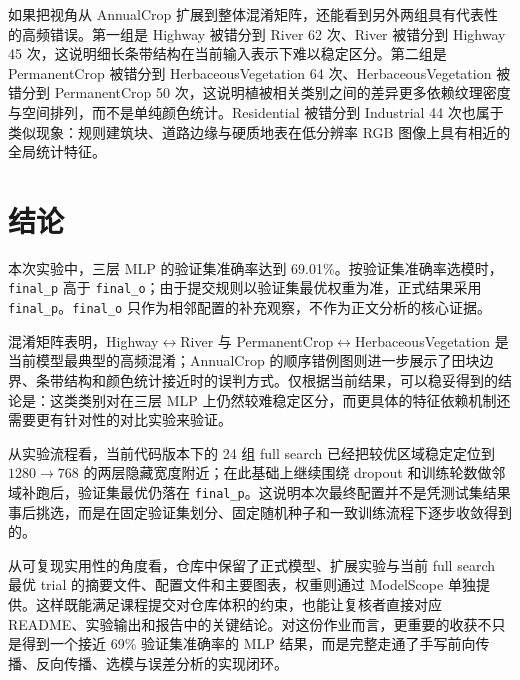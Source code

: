 \documentclass[lang=cn,a4paper,newtx,code=minted]{elegantpaper}
\begin{document}
如果把视角从 AnnualCrop 扩展到整体混淆矩阵，还能看到另外两组具有代表性的高频错误。第一组是 Highway 被错分到 River 62 次、River 被错分到 Highway 45 次，这说明细长条带结构在当前输入表示下难以稳定区分。第二组是 PermanentCrop 被错分到 HerbaceousVegetation 64 次、HerbaceousVegetation 被错分到 PermanentCrop 50 次，这说明植被相关类别之间的差异更多依赖纹理密度与空间排列，而不是单纯颜色统计。Residential 被错分到 Industrial 44 次也属于类似现象：规则建筑块、道路边缘与硬质地表在低分辨率 RGB 图像上具有相近的全局统计特征。

\section{结论}

本次实验中，三层 MLP 的验证集准确率达到 69.01\%。按验证集准确率选模时，\texttt{final\_p} 高于 \texttt{final\_o}；由于提交规则以验证集最优权重为准，正式结果采用 \texttt{final\_p}。\texttt{final\_o} 只作为相邻配置的补充观察，不作为正文分析的核心证据。

混淆矩阵表明，Highway$\leftrightarrow$River 与 PermanentCrop$\leftrightarrow$HerbaceousVegetation 是当前模型最典型的高频混淆；AnnualCrop 的顺序错例图则进一步展示了田块边界、条带结构和颜色统计接近时的误判方式。仅根据当前结果，可以稳妥得到的结论是：这类类别对在三层 MLP 上仍然较难稳定区分，而更具体的特征依赖机制还需要更有针对性的对比实验来验证。

从实验流程看，当前代码版本下的 24 组 full search 已经把较优区域稳定定位到 $1280\rightarrow768$ 的两层隐藏宽度附近；在此基础上继续围绕 dropout 和训练轮数做邻域补跑后，验证集最优仍落在 \texttt{final\_p}。这说明本次最终配置并不是凭测试集结果事后挑选，而是在固定验证集划分、固定随机种子和一致训练流程下逐步收敛得到的。

从可复现实用性的角度看，仓库中保留了正式模型、扩展实验与当前 full search 最优 trial 的摘要文件、配置文件和主要图表，权重则通过 ModelScope 单独提供。这样既能满足课程提交对仓库体积的约束，也能让复核者直接对应 README、实验输出和报告中的关键结论。对这份作业而言，更重要的收获不只是得到一个接近 69\% 验证集准确率的 MLP 结果，而是完整走通了手写前向传播、反向传播、选模与误差分析的实现闭环。
\end{document}
